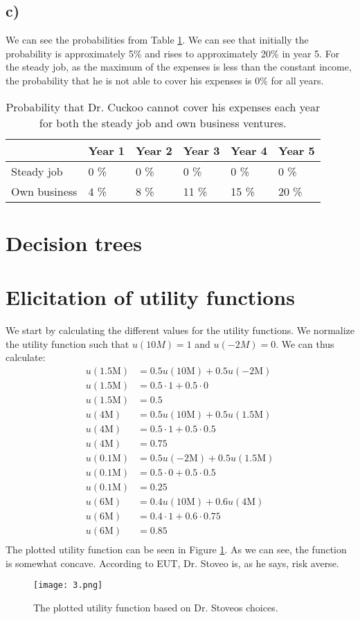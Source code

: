 \documentclass{article}
\begin{document}
\subsection{c)}
	We can see the probabilities from Table \ref{tab:1c}. We can see that initially the probability is approximately 5\% and rises to approximately 20\% in year 5. For the steady job, as the maximum of the expenses is less than the constant income, the probability that he is not able to cover his expenses is 0\% for all years.
	\begin{table}[h]
		\centering
		\caption{Probability that Dr. Cuckoo cannot cover his expenses each year for both the steady job and own business ventures.}
		\label{tab:1c}
		\begin{tabular}{l|l|l|l|l|l|}
			\cline{2-6}
			& Year 1 & Year 2 & Year 3 & Year 4 & Year 5 \\ \hline
			\multicolumn{1}{|l|}{Steady job}   & 0 \%   & 0 \%   & 0 \%   & 0 \%   & 0 \%   \\ \hline
			\multicolumn{1}{|l|}{Own business} & 4 \%   & 8 \%   & 11 \%  & 15 \%  & 20 \%  \\ \hline
		\end{tabular}
	\end{table}
\section{Decision trees}
\section{Elicitation of utility functions}
	We start by calculating the different values for the utility functions. We normalize the utility function such that $u(10M)=1$ and $u(-2M)=0$. We can thus calculate:
	\begin{align}
		u(1.5\text{M}) &= 0.5u(10\text{M}) + 0.5u(-2\text{M})\\
		u(1.5\text{M}) &= 0.5 \cdot 1 + 0.5 \cdot 0 \\ 
		u(1.5\text{M})&= 0.5 \\
		u(4\text{M}) &= 0.5u(10\text{M}) + 0.5u(1.5\text{M})\\
		u(4\text{M}) &= 0.5 \cdot 1 + 0.5 \cdot 0.5 \\ 
		u(4\text{M})&= 0.75 \\
		u(0.1\text{M}) &= 0.5u(-2\text{M}) + 0.5u(1.5\text{M})\\
		u(0.1\text{M}) &= 0.5 \cdot 0 + 0.5 \cdot 0.5 \\ 
		u(0.1\text{M})&= 0.25 \\
		u(6\text{M}) &= 0.4u(10\text{M}) + 0.6u(4\text{M})\\
		u(6\text{M}) &= 0.4 \cdot 1 + 0.6 \cdot 0.75\\ 
		u(6\text{M})&= 0.85 \\
	\end{align}
	The plotted utility function can be seen in Figure \ref{fig:3}. As we can see, the function is somewhat concave. According to EUT, Dr. Stoveo is, as he says, risk averse.
	\begin{figure}[H]
		\texttt{[image: 3.png]}
		\caption{The plotted utility function based on Dr. Stoveos choices.}
		\label{fig:3}
	\end{figure}
\end{document}
